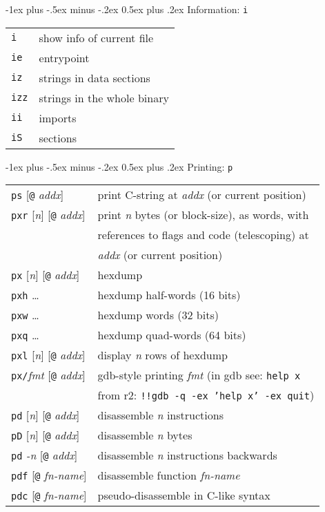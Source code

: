 \documentclass[a4paper,landscape]{article}
\makeatletter
\renewcommand{\section}{\@startsection{section}{1}{0mm}%
                                {-1ex plus -.5ex minus -.2ex}%
                                {0.5ex plus .2ex}%
                                {\normalfont\large\bfseries}}
\makeatother
\begin{document}
\begin{multicols*}{3}
\section{Information: \texttt{i}}
\begin{tabular}{@{}ll@{}}
\texttt{i} & show info of current file \\
\texttt{ie} & entrypoint \\
\texttt{iz} & strings in data sections \\
\texttt{izz} & strings in the whole binary \\
\texttt{ii} & imports \\
\texttt{iS} & sections \\
\end{tabular}

\section{Printing: \texttt{p}}
\begin{tabular}{@{}ll@{}}
\texttt{ps} [\texttt{@} \textit{addx}]& print C-string at \textit{addx} (or current position) \\
\texttt{pxr} [\textit{n}] [\texttt{@} \textit{addx}] & print \textit{n} bytes (or block-size), as words, with \\ & references to flags and code (telescoping) at \\ & \textit{addx} (or current position)\\
\texttt{px} [\textit{n}] [\texttt{@} \textit{addx}] & hexdump \\
\texttt{pxh} \ldots & hexdump half-words (16 bits) \\
\texttt{pxw} \ldots & hexdump words (32 bits) \\
\texttt{pxq} \ldots & hexdump quad-words (64 bits) \\
\texttt{pxl} [\textit{n}] [\texttt{@} \textit{addx}] & display \textit{n} rows of hexdump \\
\texttt{px/}\textit{fmt} [\texttt{@} \textit{addx}] & gdb-style printing \textit{fmt} (in gdb see: \texttt{help x} \\ & from r2: \texttt{!!gdb -q -ex 'help x' -ex quit}) \\
\texttt{pd} [\textit{n}] [\texttt{@} \textit{addx}] & disassemble \textit{n} instructions \\
\texttt{pD} [\textit{n}] [\texttt{@} \textit{addx}] & disassemble \textit{n} bytes \\
\texttt{pd} \textit{-n}  [\texttt{@} \textit{addx}] & disassemble \textit{n} instructions backwards \\
\texttt{pdf} [\texttt{@} \textit{fn-name}] & disassemble function \textit{fn-name} \\
\texttt{pdc} [\texttt{@} \textit{fn-name}] & pseudo-disassemble in C-like syntax
\end{tabular}


\end{multicols*}
\end{document}
